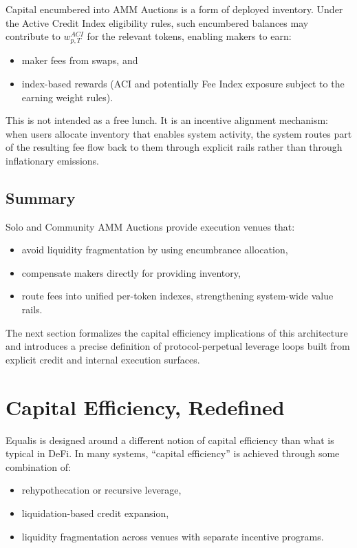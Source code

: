 \documentclass[version=preprint]{iacrcc}
\begin{document}
Capital encumbered into AMM Auctions is a form of deployed inventory. Under the Active Credit Index eligibility rules, such encumbered balances may contribute to $w^{ACI}_{p,T}$ for the relevant tokens, enabling makers to earn:
\begin{itemize}
  \item maker fees from swaps, and
  \item index-based rewards (ACI and potentially Fee Index exposure subject to the earning weight rules).
\end{itemize}

This is not intended as a free lunch. It is an incentive alignment mechanism: when users allocate inventory that enables system activity, the system routes part of the resulting fee flow back to them through explicit rails rather than through inflationary emissions.

\subsection{Summary}

Solo and Community AMM Auctions provide execution venues that:
\begin{itemize}
  \item avoid liquidity fragmentation by using encumbrance allocation,
  \item compensate makers directly for providing inventory,
  \item route fees into unified per-token indexes, strengthening system-wide value rails.
\end{itemize}

The next section formalizes the capital efficiency implications of this architecture and introduces a precise definition of protocol-perpetual leverage loops built from explicit credit and internal execution surfaces.

\section{Capital Efficiency, Redefined}

Equalis is designed around a different notion of capital efficiency than what is typical in DeFi. In many systems, ``capital efficiency'' is achieved through some combination of:
\begin{itemize}
  \item rehypothecation or recursive leverage,
  \item liquidation-based credit expansion,
  \item liquidity fragmentation across venues with separate incentive programs.
\end{itemize}
\end{document}
